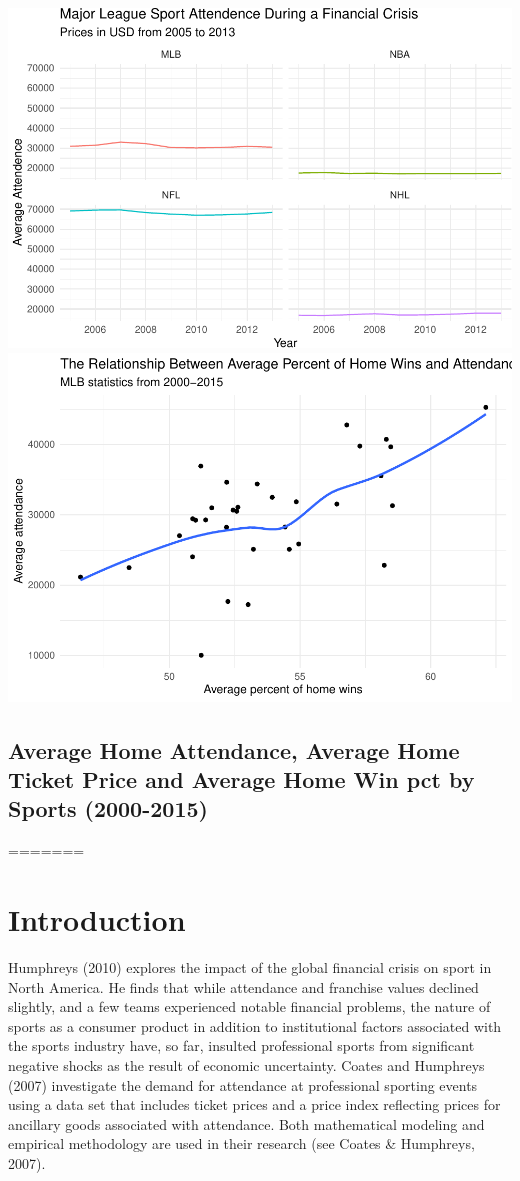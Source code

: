 \documentclass[man, fleqn, noextraspace,floatsintext]{apa6}
\begin{document}
\includegraphics{Final_Project_files/figure-latex/unnamed-chunk-1-1.pdf}
\includegraphics{Final_Project_files/figure-latex/unnamed-chunk-1-2.pdf}

\subsection{Average Home Attendance, Average Home Ticket Price and
Average Home Win pct by Sports
(2000-2015)}\label{average-home-attendance-average-home-ticket-price-and-average-home-win-pct-by-sports-2000-2015}
=======
\hypertarget{introduction}{%
\section{Introduction}\label{introduction}}

Humphreys (2010) explores the impact of the global financial crisis on sport in North America. He finds that while attendance and franchise values declined slightly, and a few teams experienced notable financial problems, the nature of sports as a consumer product in addition to institutional factors associated with the sports industry have, so far, insulted professional sports from significant negative shocks as the result of economic uncertainty. Coates and Humphreys (2007) investigate the demand for attendance at professional sporting events using a data set that includes ticket prices and a price index reflecting prices for ancillary goods associated with attendance. Both mathematical modeling and empirical methodology are used in their research (see Coates \& Humphreys, 2007).
\end{document}
